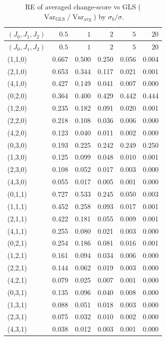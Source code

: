 \documentclass[
  11pt,
]{article}
\begin{document}
\begin{longtable}[]{@{}lrrrrr@{}}
\caption{RE of averaged change-score vs GLS
(\(\mathop{\mathrm{Var}}_{\text{GLS}} / \mathop{\mathrm{Var}}_{\text{avg}}\))
by \(\sigma_b/\sigma\).}\tabularnewline
\toprule\noalign{}
\((J_0,J_1,J_2)\) & \(0.5\) & \(1\) & \(2\) & \(5\) & \(20\) \\
\midrule\noalign{}
\endfirsthead
\toprule\noalign{}
\((J_0,J_1,J_2)\) & \(0.5\) & \(1\) & \(2\) & \(5\) & \(20\) \\
\midrule\noalign{}
\endhead
\bottomrule\noalign{}
\endlastfoot
(1,1,0) & 0.667 & 0.500 & 0.250 & 0.056 & 0.004 \\
(2,1,0) & 0.653 & 0.344 & 0.117 & 0.021 & 0.001 \\
(4,1,0) & 0.427 & 0.149 & 0.041 & 0.007 & 0.000 \\
(0,2,0) & 0.364 & 0.400 & 0.429 & 0.442 & 0.444 \\
(1,2,0) & 0.235 & 0.182 & 0.091 & 0.020 & 0.001 \\
(2,2,0) & 0.218 & 0.108 & 0.036 & 0.006 & 0.000 \\
(4,2,0) & 0.123 & 0.040 & 0.011 & 0.002 & 0.000 \\
(0,3,0) & 0.193 & 0.225 & 0.242 & 0.249 & 0.250 \\
(1,3,0) & 0.125 & 0.099 & 0.048 & 0.010 & 0.001 \\
(2,3,0) & 0.108 & 0.052 & 0.017 & 0.003 & 0.000 \\
(4,3,0) & 0.055 & 0.017 & 0.005 & 0.001 & 0.000 \\
(0,1,1) & 0.727 & 0.533 & 0.245 & 0.050 & 0.003 \\
(1,1,1) & 0.452 & 0.258 & 0.093 & 0.017 & 0.001 \\
(2,1,1) & 0.422 & 0.181 & 0.055 & 0.009 & 0.001 \\
(4,1,1) & 0.255 & 0.080 & 0.021 & 0.003 & 0.000 \\
(0,2,1) & 0.254 & 0.186 & 0.081 & 0.016 & 0.001 \\
(1,2,1) & 0.161 & 0.094 & 0.034 & 0.006 & 0.000 \\
(2,2,1) & 0.144 & 0.062 & 0.019 & 0.003 & 0.000 \\
(4,2,1) & 0.079 & 0.025 & 0.007 & 0.001 & 0.000 \\
(0,3,1) & 0.135 & 0.096 & 0.040 & 0.008 & 0.000 \\
(1,3,1) & 0.088 & 0.051 & 0.018 & 0.003 & 0.000 \\
(2,3,1) & 0.075 & 0.032 & 0.010 & 0.002 & 0.000 \\
(4,3,1) & 0.038 & 0.012 & 0.003 & 0.001 & 0.000 \\
\end{longtable}
\end{document}

